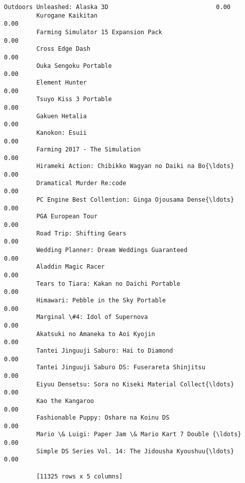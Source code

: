 \documentclass[11pt]{article}
\begin{document}
\begin{Verbatim}[commandchars=\\\{\}]
         Outdoors Unleashed: Alaska 3D                              0.00  
         Kurogane Kaikitan                                          0.00  
         Farming Simulator 15 Expansion Pack                        0.00  
         Cross Edge Dash                                            0.00  
         Ouka Sengoku Portable                                      0.00  
         Element Hunter                                             0.00  
         Tsuyo Kiss 3 Portable                                      0.00  
         Gakuen Hetalia                                             0.00  
         Kanokon: Esuii                                             0.00  
         Farming 2017 - The Simulation                              0.00  
         Hirameki Action: Chibikko Wagyan no Daiki na Bo{\ldots}         0.00  
         Dramatical Murder Re:code                                  0.00  
         PC Engine Best Collention: Ginga Ojousama Dense{\ldots}         0.00  
         PGA European Tour                                          0.00  
         Road Trip: Shifting Gears                                  0.00  
         Wedding Planner: Dream Weddings Guaranteed                 0.00  
         Aladdin Magic Racer                                        0.00  
         Tears to Tiara: Kakan no Daichi Portable                   0.00  
         Himawari: Pebble in the Sky Portable                       0.00  
         Marginal \#4: Idol of Supernova                             0.00  
         Akatsuki no Amaneka to Aoi Kyojin                          0.00  
         Tantei Jinguuji Saburo: Hai to Diamond                     0.00  
         Tantei Jinguuji Saburo DS: Fuserareta Shinjitsu            0.00  
         Eiyuu Densetsu: Sora no Kiseki Material Collect{\ldots}         0.00  
         Kao the Kangaroo                                           0.00  
         Fashionable Puppy: Oshare na Koinu DS                      0.00  
         Mario \& Luigi: Paper Jam \& Mario Kart 7 Double {\ldots}         0.00  
         Simple DS Series Vol. 14: The Jidousha Kyoushuu{\ldots}         0.00  
         
         [11325 rows x 5 columns]
\end{Verbatim}
            

    
    
    
    
\end{document}

